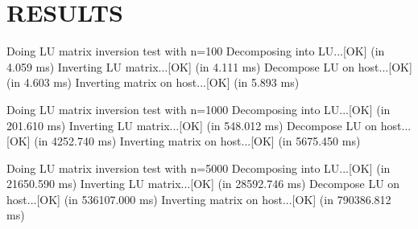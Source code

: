 
\section{RESULTS}\label{sec:results}
Doing LU matrix inversion test with n=100
Decomposing into LU...[OK] (in 4.059 ms)
Inverting LU matrix...[OK] (in 4.111 ms)
Decompose LU on host...[OK] (in 4.603 ms)
Inverting matrix on host...[OK] (in 5.893 ms)



Doing LU matrix inversion test with n=1000
Decomposing into LU...[OK] (in 201.610 ms)
Inverting LU matrix...[OK] (in 548.012 ms)
Decompose LU on host...[OK] (in 4252.740 ms)
Inverting matrix on host...[OK] (in 5675.450 ms)

Doing LU matrix inversion test with n=5000
Decomposing into LU...[OK] (in 21650.590 ms)
Inverting LU matrix...[OK] (in 28592.746 ms)
Decompose LU on host...[OK] (in 536107.000 ms)
Inverting matrix on host...[OK] (in 790386.812 ms)

